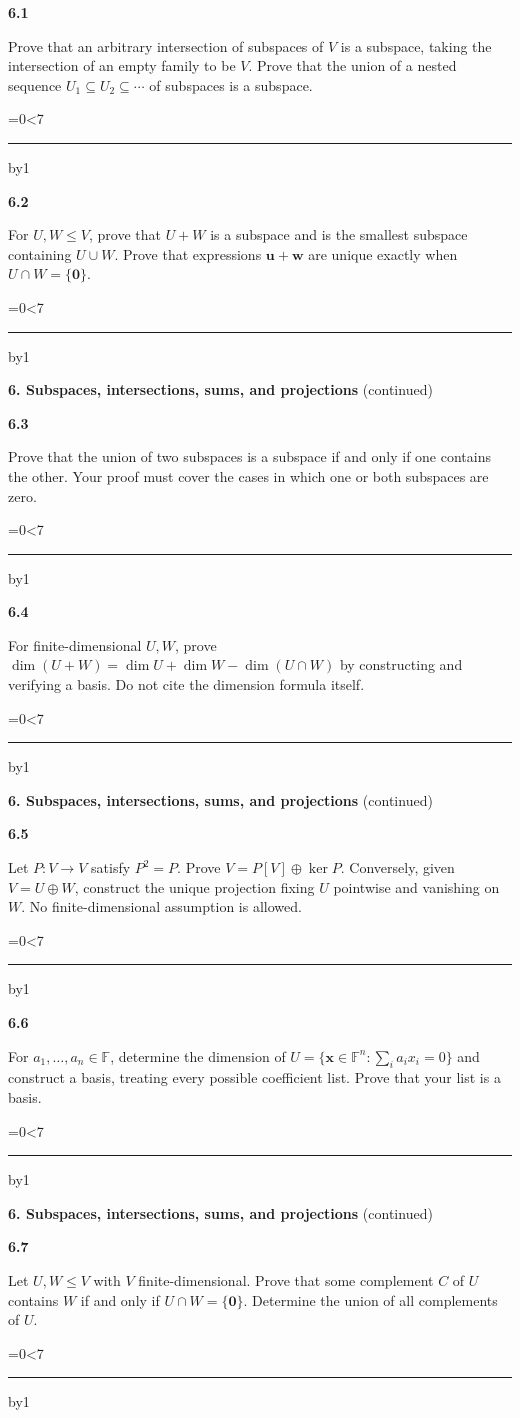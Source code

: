 \documentclass[11pt,letterpaper]{article}
\newcommand{\topicshort}{Problem collection}
\newcommand{\F}{\mathbb F}\newcommand{\R}{\mathbb R}\newcommand{\Q}{\mathbb Q}\newcommand{\C}{\mathbb C}\newcommand{\Z}{\mathbb Z}
\newcommand{\ruled}[1]{\par\begingroup\parskip=0pt\baselineskip=17pt\count255=0\loop\ifnum\count255<#1\noindent\textcolor{black!17}{\rule{\linewidth}{.25pt}}\par\advance\count255 by1\repeat\endgroup}
\newcommand{\problem}[4]{\noindent\begin{minipage}[t][3.48in][t]{\linewidth}\textbf{\color{navy}#1}\quad{\small\sffamily\color{teal}#2#3}\par #4\par\vfill\ruled{7}\end{minipage}}
\begin{document}
\problem{6.1}{W}{ / $\star$}{Prove that an arbitrary intersection of subspaces of $V$ is a subspace, taking the intersection of an empty family to be $V$. Prove that the union of a nested sequence $U_1\subseteq U_2\subseteq\cdots$ of subspaces is a subspace.}
\par\vspace{14pt}
\problem{6.2}{W}{ / $\star$}{For $U,W\le V$, prove that $U+W$ is a subspace and is the smallest subspace containing $U\cup W$. Prove that expressions $\mathbf u+\mathbf w$ are unique exactly when $U\cap W=\{\mathbf0\}$.}
\newpage
\renewcommand{\topicshort}{Subspaces and sums}
{\large\bfseries\color{navy}6. Subspaces, intersections, sums, and projections} {\small(continued)}\par\vspace{9pt}
\problem{6.3}{M}{}{Prove that the union of two subspaces is a subspace if and only if one contains the other. Your proof must cover the cases in which one or both subspaces are zero.}
\par\vspace{14pt}
\problem{6.4}{M}{ / $\star$}{For finite-dimensional $U,W$, prove $\dim(U+W)=\dim U+\dim W-\dim(U\cap W)$ by constructing and verifying a basis. Do not cite the dimension formula itself.}
\newpage
\renewcommand{\topicshort}{Subspaces and sums}
{\large\bfseries\color{navy}6. Subspaces, intersections, sums, and projections} {\small(continued)}\par\vspace{9pt}
\problem{6.5}{M}{ / $\star$}{Let $P:V\to V$ satisfy $P^2=P$. Prove $V=P[V]\oplus\ker P$. Conversely, given $V=U\oplus W$, construct the unique projection fixing $U$ pointwise and vanishing on $W$. No finite-dimensional assumption is allowed.}
\par\vspace{14pt}
\problem{6.6}{M}{}{For $a_1,\ldots,a_n\in\F$, determine the dimension of $U=\{\mathbf x\in\F^n:\sum_i a_ix_i=0\}$ and construct a basis, treating every possible coefficient list. Prove that your list is a basis.}
\newpage
\renewcommand{\topicshort}{Subspaces and sums}
{\large\bfseries\color{navy}6. Subspaces, intersections, sums, and projections} {\small(continued)}\par\vspace{9pt}
\problem{6.7}{M}{}{Let $U,W\le V$ with $V$ finite-dimensional. Prove that some complement $C$ of $U$ contains $W$ if and only if $U\cap W=\{\mathbf0\}$. Determine the union of all complements of $U$.}
\par\vspace{14pt}
\end{document}
